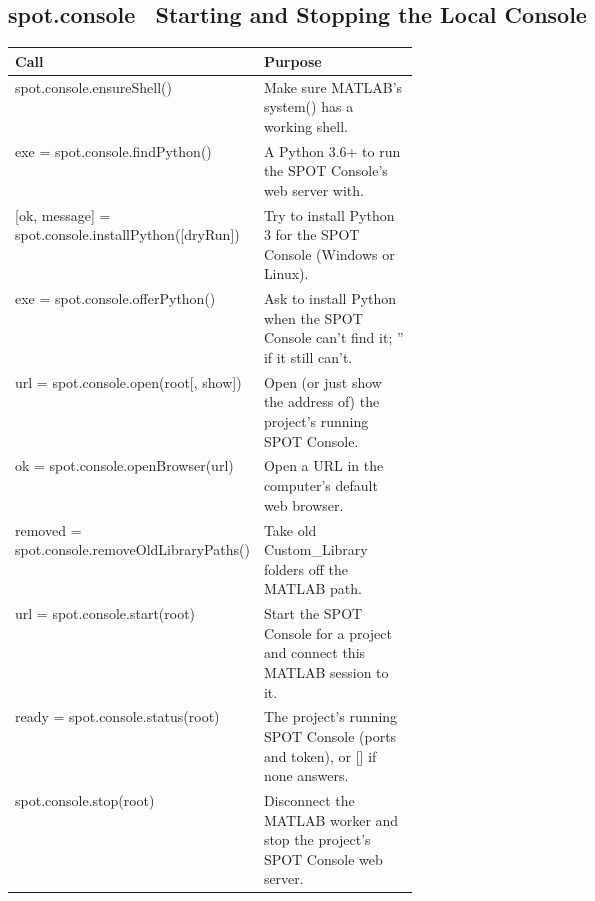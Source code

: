 \documentclass[11pt,a4paper]{article}
\begin{document}
\subsection*{spot.console \textmd{\textendash\ Starting and Stopping the Local Console}}
\begin{xltabular}{\linewidth}{@{}>{\raggedright\arraybackslash\ttfamily\footnotesize}p{0.47\linewidth} >{\raggedright\arraybackslash\small}X@{}}
\toprule \normalfont\small\textbf{Call} & \textbf{Purpose} \\ \midrule \endhead
spot.console.ensureShell() & Make sure MATLAB's system() has a working shell. \\
exe = spot.console.findPython() & A Python 3.6+ to run the SPOT Console's web server with. \\
{}[ok, message] = spot.console.installPython([dryRun]) & Try to install Python 3 for the SPOT Console (Windows or Linux). \\
exe = spot.console.offerPython() & Ask to install Python when the SPOT Console can't find it; '' if it still can't. \\
url = spot.console.open(root[, show]) & Open (or just show the address of) the project's running SPOT Console. \\
ok = spot.console.openBrowser(url) & Open a URL in the computer's default web browser. \\
removed = spot.console.removeOldLibraryPaths() & Take old Custom\_Library folders off the MATLAB path. \\
url = spot.console.start(root) & Start the SPOT Console for a project and connect this MATLAB session to it. \\
ready = spot.console.status(root) & The project's running SPOT Console (ports and token), or [] if none answers. \\
spot.console.stop(root) & Disconnect the MATLAB worker and stop the project's SPOT Console web server. \\
\bottomrule\end{xltabular}
\end{document}
